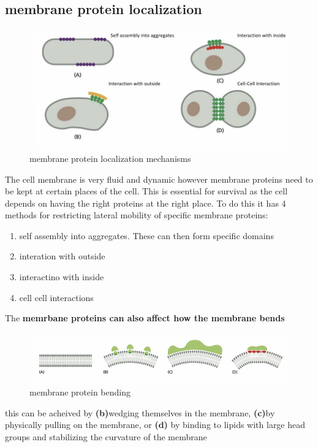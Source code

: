 \documentclass[../main.tex]{subfiles}
\begin{document}
\subsection{membrane protein localization}
\begin{figure}[H]
    \centering
    \includegraphics[width=0.5\linewidth]{localization.png}
    \caption{membrane protein localization mechanisms}
    \label{fig:enter-label}
\end{figure}

The cell membrane is very fluid and dynamic however membrane proteins need to be kept at certain places of the cell. This is essential for survival as the cell depends on having the right proteins at the right place. To do this it has 4 methods for restricting lateral mobility of specific membrane proteins:

\begin{enumerate}
    \item self assembly into aggregates. These can then form specific domains
    \item interation with outside 
    \item interactino with inside
    \item cell cell interactions
\end{enumerate}

The\textbf{ memrbane proteins can also affect how the membrane bends}

\begin{figure}[H]
    \centering
    \includegraphics[width=\linewidth]{bending.png}
    \caption{membrane protein bending}
    \label{fig:enter-label}
\end{figure}
this can be acheived by  \textbf{(b)}wedging themselves in the membrane, \textbf{(c)}by physically pulling on the membrane, or \textbf{(d)} by binding to lipids with large head groups and stabilizing the curvature of the membrane 
\end{document}
